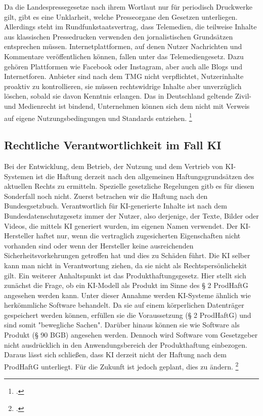 \documentclass[Thesis.tex]{subfiles}
\begin{document}
Da die Landespressegesetze nach ihrem Wortlaut nur für periodisch Druckwerke gilt,
gibt es eine Unklarheit, welche Presseorgane den Gesetzen unterliegen. Allerdings
steht im Rundfunkstaatsvertrag, dass Telemedien, die teilweise Inhalte aus klassischen
Pressedrucken verwenden den jornalistischen Grundsätzen entsprechen müssen. 
Internetplattformen, auf denen Nutzer Nachrichten und Kommentare veröffentlichen können,
fallen unter das Telemediengesetz. Dazu gehören Plattformen wie Facebook oder Instagram,
aber auch alle Blogs und Internetforen. Anbieter sind nach dem TMG nicht verpflichtet,
Nutzerinhalte proaktiv zu kontrollieren, sie müssen rechtswidrige Inhalte aber unverzüglich löschen,
sobald sie davon Kenntnis erlangen. Das in Deutschland geltende Zivil- und Medienrecht ist bindend,
Unternehmen können sich dem nicht mit Verweis auf eigene Nutzungsbedingungen und Standards entziehen. \footcite{DBWDUmgangmitFakenews} %

\subsection{Rechtliche Verantwortlichkeit im Fall KI}
Bei der Entwicklung, dem Betrieb, der Nutzung und dem Vertrieb von KI-Systemen ist die Haftung
derzeit nach den allgemeinen Haftungsgrundsätzen des aktuellen Rechts zu ermitteln. Spezielle gesetzliche
Regelungen gitb es für diesen Sonderfall noch nicht.
Zuerst betrachen wir die Haftung nach den Bundesgsetzbuch. 
Verantwortlich für KI-generierte Inhalte ist nach dem Bundesdatenschutzgesetz immer der Nutzer,
also derjenige, der Texte, Bilder oder Videos, die mittels KI generiert wurden, im eigenen Namen verwendet.
Der KI-Hersteller haftet nur, wenn die vertraglich zugesicherten Eigenschaften nicht vorhanden sind oder wenn der Hersteller
keine ausreichenden Sicherheitsvorkehrungen getroffen hat und dies zu Schäden führt.
Die KI selber kann man nicht in Verantwortung ziehen, da sie nicht als Rechtspersönlichekit gilt.
Ein weiterer Anhaltspunkt ist das Produkthaftungsgesetz. Hier stellt sich zunächst die Frage,
ob ein KI-Modell als Produkt im Sinne des § 2 ProdHaftG angesehen werden kann.
Unter dieser Annahme werden KI-Systeme ähnlich wie herkömmliche Software behandelt.
Da sie auf einem körperlichen Datenträger gespeichert werden können, erfüllen sie die Voraussetzung
(§ 2 ProdHaftG) und sind somit "bewegliche Sachen". Darüber hinaus können sie wie Software als
Produkt (§ 90 BGB) angesehen werden. Dennoch wird Software vom Gesetzgeber nicht ausdrücklich
in den Anwendungsbereich der Produkthaftung einbezogen. Daraus lässt sich schließen, dass KI
derzeit nicht der Haftung nach dem ProdHaftG unterliegt. Für die Zukunft ist jedoch geplant, dies zu ändern. \footcite{KIHaftung2024}
\end{document}
